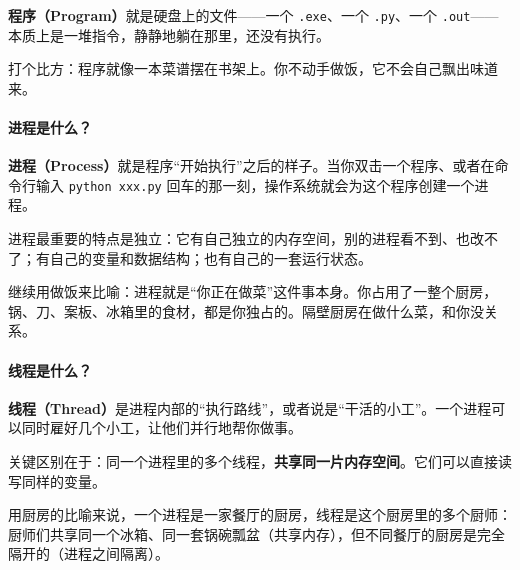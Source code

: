 \textbf{程序（Program）}就是硬盘上的文件——一个 \verb|.exe|、一个 \verb|.py|、一个 \verb|.out|——本质上是一堆指令，静静地躺在那里，还没有执行。

打个比方：程序就像一本菜谱摆在书架上。你不动手做饭，它不会自己飘出味道来。

\paragraph{进程是什么？}

\textbf{进程（Process）}就是程序“开始执行”之后的样子。当你双击一个程序、或者在命令行输入 \verb|python xxx.py| 回车的那一刻，操作系统就会为这个程序创建一个进程。

进程最重要的特点是独立：它有自己独立的内存空间，别的进程看不到、也改不了；有自己的变量和数据结构；也有自己的一套运行状态。

继续用做饭来比喻：进程就是“你正在做菜”这件事本身。你占用了一整个厨房，锅、刀、案板、冰箱里的食材，都是你独占的。隔壁厨房在做什么菜，和你没关系。

\paragraph{线程是什么？}

\textbf{线程（Thread）}是进程内部的“执行路线”，或者说是“干活的小工”。一个进程可以同时雇好几个小工，让他们并行地帮你做事。

关键区别在于：同一个进程里的多个线程，\textbf{共享同一片内存空间}。它们可以直接读写同样的变量。

用厨房的比喻来说，一个进程是一家餐厅的厨房，线程是这个厨房里的多个厨师：厨师们共享同一个冰箱、同一套锅碗瓢盆（共享内存），但不同餐厅的厨房是完全隔开的（进程之间隔离）。

